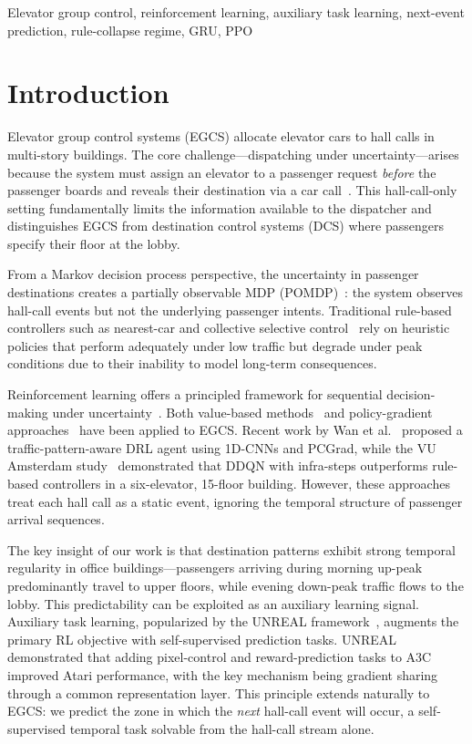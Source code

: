 \documentclass[conference]{IEEEtran}
\begin{document}
\begin{IEEEkeywords}
Elevator group control, reinforcement learning, auxiliary task
learning, next-event prediction, rule-collapse regime, GRU, PPO
\end{IEEEkeywords}

\section{Introduction}
\label{sec:introduction}

Elevator group control systems (EGCS) allocate elevator cars to hall
calls in multi-story buildings. The core challenge---dispatching
under uncertainty---arises because the system must assign an elevator
to a passenger request \emph{before} the passenger boards and reveals
their destination via a car call~\cite{barney2003elevator}. This
hall-call-only setting fundamentally limits the information available
to the dispatcher and distinguishes EGCS from destination control
systems (DCS) where passengers specify their floor at the lobby.

From a Markov decision process perspective, the uncertainty in
passenger destinations creates a partially observable MDP
(POMDP)~\cite{sutton2018reinforcement}: the system observes hall-call
events but not the underlying passenger intents. Traditional
rule-based controllers such as nearest-car and collective selective
control~\cite{siikonen1997elevator} rely on heuristic policies that
perform adequately under low traffic but degrade under peak
conditions due to their inability to model long-term consequences.

Reinforcement learning offers a principled framework for sequential
decision-making under uncertainty~\cite{sutton2018reinforcement}.
Both value-based methods~\cite{mnih2015dqn,crites1998elevator} and
policy-gradient approaches~\cite{schulman2017ppo} have been applied
to EGCS. Recent work by Wan et al.~\cite{wan2024traffic} proposed a
traffic-pattern-aware DRL agent using 1D-CNNs and PCGrad, while the
VU Amsterdam study~\cite{vu2025rl} demonstrated that DDQN with
infra-steps outperforms rule-based controllers in a six-elevator,
15-floor building. However, these approaches treat each hall call as
a static event, ignoring the temporal structure of passenger arrival
sequences.

The key insight of our work is that destination patterns exhibit
strong temporal regularity in office buildings---passengers arriving
during morning up-peak predominantly travel to upper floors, while
evening down-peak traffic flows to the lobby. This predictability can
be exploited as an auxiliary learning signal. Auxiliary task
learning, popularized by the UNREAL
framework~\cite{jaderberg2017unreal}, augments the primary RL
objective with self-supervised prediction tasks. UNREAL demonstrated
that adding pixel-control and reward-prediction tasks to A3C improved
Atari performance, with the key mechanism being gradient sharing
through a common representation layer. This principle extends
naturally to EGCS: we predict the zone in which the \emph{next}
hall-call event will occur, a self-supervised temporal task
solvable from the hall-call stream alone.
\end{document}
